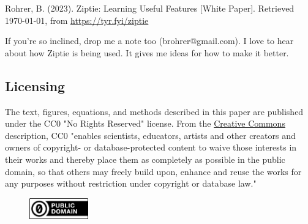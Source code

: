 Rohrer, B. (2023). Ziptie: Learning Useful Features [White Paper].
Retrieved \today, from
\href{https://tyr.fyi/ziptie}{https://tyr.fyi/ziptie}

If you're so inclined, drop me a note too (brohrer@gmail.com).
I love to hear about how
Ziptie is being used. It gives me ideas for how to make it better.

\subsection{Licensing}
\label{subsec:license}

The text, figures, equations, and methods described in this paper
are published under the CC0 "No Rights Reserved" license.
From the
\href{https://creativecommons.org/public-domain/cc0/}{Creative Commons} description,
CC0 "enables scientists, educators,
artists and other creators and owners of copyright- or database-protected
content to waive those interests in their works and thereby place them as
completely as possible in the public domain, so that others may freely
build upon, enhance and reuse the works for any purposes without restriction
under copyright or database law."

\begin{figure}[ht]
\vskip 0.2in
\begin{center}
\centerline{\includegraphics[width=1.0in]{images/cc-zero.png}}
\label{fig:cc0}
\end{center}
\vskip -0.2in
\end{figure}

